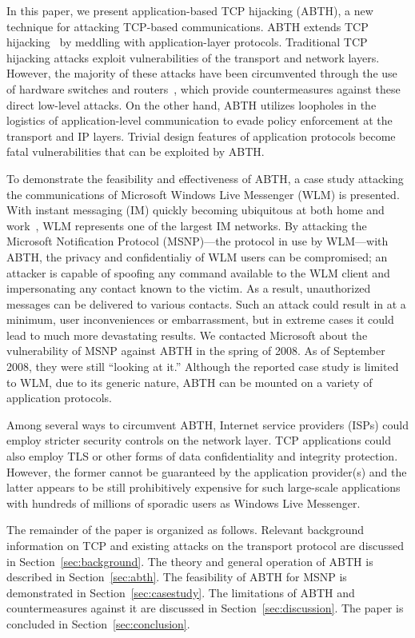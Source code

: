 \documentclass{sig-alternate}
\begin{document}
In this paper, we present application-based TCP hijacking (ABTH), a new technique for attacking TCP-based communications.
ABTH extends TCP hijacking~\cite{stamp:infosec} by meddling with application-layer protocols.
Traditional TCP hijacking attacks exploit vulnerabilities of the transport and network layers.
However, the majority of these attacks have been circumvented through the use of hardware switches and routers~\cite{dubrawsky:layer2}, which provide countermeasures against these direct low-level attacks.
On the other hand, ABTH utilizes loopholes in the logistics of application-level communication to evade policy enforcement at the transport and IP layers.
Trivial design features of application protocols become fatal vulnerabilities that can be exploited by ABTH.

To demonstrate the feasibility and effectiveness of ABTH, a case study attacking the communications of Microsoft Windows Live Messenger (WLM) is presented.
With instant messaging (IM) quickly becoming ubiquitous at both home and work~\cite{aol:survey}, WLM represents one of the largest IM networks.
By attacking the Microsoft Notification Protocol (MSNP)---the protocol in use by WLM---with ABTH, the privacy and confidentialiy of WLM users can be compromised; an attacker is capable of spoofing any command available to the WLM client and impersonating any contact known to the victim.
As a result, unauthorized messages can be delivered to various contacts.
Such an attack could result in at a minimum, user inconveniences or embarrassment, but in extreme cases it could lead to much more devastating results.
We contacted Microsoft about the vulnerability of MSNP against ABTH in the spring of 2008.
As of September 2008, they were still ``looking at it.'' 
Although the reported case study is limited to WLM, due to its generic nature, ABTH can be mounted on a variety of application protocols.

Among several ways to circumvent ABTH, Internet service providers (ISPs) could employ stricter security controls on the network layer.
TCP applications could also employ TLS or other forms of data confidentiality and integrity protection.
However, the former cannot be guaranteed by the application provider(s) and the latter appears to be still prohibitively expensive for such large-scale applications with hundreds of millions of sporadic users as Windows Live Messenger.

The remainder of the paper is organized as follows.
Relevant background information on TCP and existing attacks on the transport protocol are discussed in Section~\ref{sec:background}.
The theory and general operation of ABTH is described in Section~\ref{sec:abth}.
The feasibility of ABTH for MSNP is demonstrated in Section~\ref{sec:casestudy}.
The limitations of ABTH and countermeasures against it are discussed in Section~\ref{sec:discussion}.
The paper is concluded in Section~\ref{sec:conclusion}.
\end{document}
